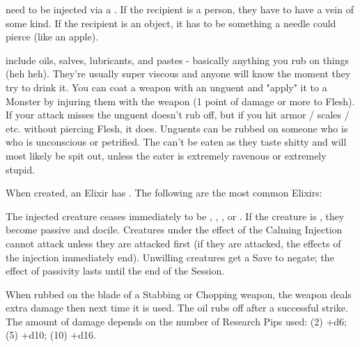  need to be injected via a .  If the recipient is a person, they have to have a vein of some kind.  If the recipient is an object, it has to be something a needle could pierce (like an apple).

 include oils, salves, lubricants, and pastes - basically anything you rub on things (heh heh).  They're usually super viscous and anyone will know the moment they try to drink it.  You can coat a weapon with an unguent  and "apply" it to a Monster by injuring them with the weapon (1 point of damage or more to Flesh).  If your attack misses the unguent doesn't rub off, but if you hit armor / scales / etc. without piercing Flesh, it does.  Unguents can be rubbed on someone who is who is unconscious or petrified.  The can’t be eaten as they taste shitty and will most likely be spit out, unless the eater is extremely ravenous or extremely stupid.


When created, an Elixir has . The following are the most common Elixirs:

\newpage 

\CHYMISTRY[
    Name=Al-Farabi's Calming Injection,
    Link=chymistry-al-farabis-calming-injection,
    Type=Sera,
    Pips=5,
    Time=Weeks
]

  The injected creature ceases immediately to be , , , or .  If the creature is , they become passive and docile.  Creatures under the effect of the Calming Injection cannot attack unless they are attacked first (if they are attacked, the effects of the injection immediately end). Unwilling creatures get a Save to negate; the effect of passivity lasts until the end of the Session.

  \CHYMISTRY[
    Name=Boyle's Sharpening Paste,
    Link=chymistry-boyles-sharpening-paste,
    Type=Unguent,
    Pips=2+,
    Time=Days
  ]

  When rubbed on the blade of a Stabbing or Chopping weapon, the weapon deals extra damage then next time it is used. The oil rubs off after a successful strike. The amount of damage depends on the number of Research Pips used:  (2) +d6; (5) +d10; (10) +d16.  


  \CHYMISTRY[
    Name=Brahe's Efficacious Sealant,
    Link=chymistry-brahes-efficacious-sealant,
    Type=Unguent,
    Pips=5,
    Time=Weeks
  ]


